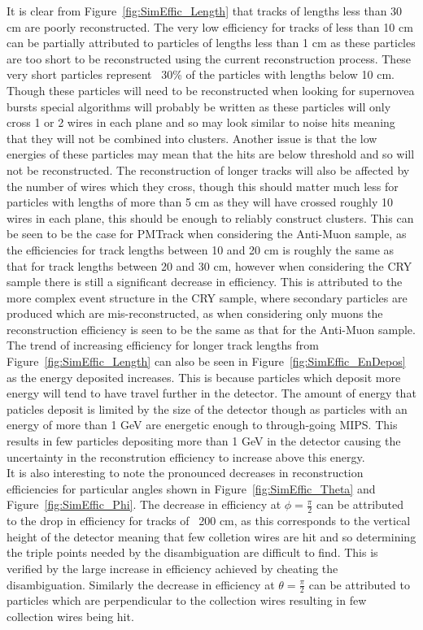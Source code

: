 It is clear from Figure~\ref{fig:SimEffic_Length} that tracks of lengths less than 30 cm are poorly reconstructed. The very low efficiency for tracks of less than 10 cm can be partially attributed to particles of lengths less than 1 cm as these particles are too short to be reconstructed using the current reconstruction process. These very short particles represent ~30\% of the particles with lengths below 10 cm. Though these particles will need to be reconstructed when looking for supernovea bursts special algorithms will probably be written as these particles will only cross 1 or 2 wires in each plane and so may look similar to noise hits meaning that they will not be combined into clusters. Another issue is that the low energies of these particles may mean that the hits are below threshold and so will not be reconstructed. The reconstruction of longer tracks will also be affected by the number of wires which they cross, though this should matter much less for particles with lengths of more than 5 cm as they will have crossed roughly 10 wires in each plane, this should be enough to reliably construct clusters. This can be seen to be the case for PMTrack when considering the Anti-Muon sample, as the efficiencies for track lengths between 10 and 20 cm is roughly the same as that for track lengths between 20 and 30 cm, however when considering the CRY sample there is still a significant decrease in efficiency. This is attributed to the more complex event structure in the CRY sample, where secondary particles are produced which are mis-reconstructed, as when considering only muons the reconstruction efficiency is seen to be the same as that for the Anti-Muon sample. \\

The trend of increasing efficiency for longer track lengths from Figure~\ref{fig:SimEffic_Length} can also be seen in Figure~\ref{fig:SimEffic_EnDepos} as the energy deposited increases. This is because particles which deposit more energy will tend to have travel further in the detector. The amount of energy that paticles deposit is limited by the size of the detector though as particles with an energy of more than 1 GeV are energetic enough to through-going MIPS. This results in few particles depositing more than 1 GeV in the detector causing the uncertainty in the reconstrution efficiency to increase above this energy. \\

It is also interesting to note the pronounced decreases in reconstruction efficiencies for particular angles shown in Figure~\ref{fig:SimEffic_Theta} and Figure~\ref{fig:SimEffic_Phi}. The decrease in efficiency at $\phi = \frac{\pi}{2}$ can be attributed to the drop in efficiency for tracks of ~200 cm, as this corresponds to the vertical height of the detector meaning that few colletion wires are hit and so determining the triple points needed by the disambiguation are difficult to find. This is verified by the large increase in efficiency achieved by cheating the disambiguation. Similarly the decrease in efficiency at $\theta = \frac{\pi}{2}$ can be attributed to particles which are perpendicular to the collection wires resulting in few collection wires being hit. \\  


